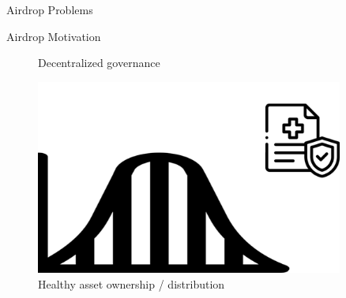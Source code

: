 \documentclass[handout]{beamer}
\begin{document}
\begin{frame}{Airdrop Problems}
	\vspace{1.5em}
	\scalebox{0.66}{
	
		\begin{tikzpicture}
			
		\end{tikzpicture}
	}	
	
\end{frame}


\begin{frame}{Airdrop Motivation}

\vspace{20pt}%


  \begin{figure}[H]
  \hspace{-15pt}
  \begin{minipage}[t]{.35\textwidth}
  	\center 
	\scalebox{0.8}{
		\begin{tikzpicture}
  			
		\end{tikzpicture}
	}
    Decentralized governance
  \end{minipage}
  \hspace{16pt}
  \begin{minipage}[t]{.25\textwidth}\vspace{-88pt}%
  \center
    \includegraphics[width=0.9\textwidth]{../assets/images/healthy_distribution.png}
	\vspace{0.8em}\vspace{3.2em}    
    Healthy asset ownership / distribution
  \end{minipage}
  \hfill
  \begin{minipage}[t]{.25\textwidth}\vspace{-77pt}%
  \center 

\end{minipage}
\end{figure}
\end{frame}
\end{document}
